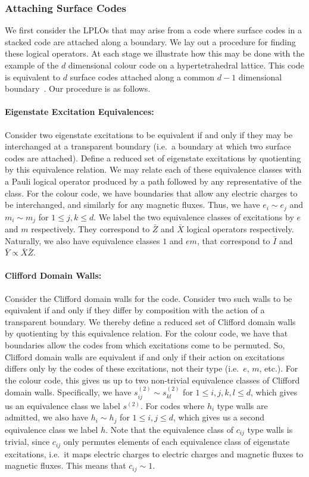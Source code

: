 \documentclass[pra,twocolumn,a4paper,nofootinbib]{revtex4-1}
\begin{document}
\subsubsection{Attaching Surface Codes}
We first consider the LPLOs that may arise from a code where surface codes in a stacked code are attached along a boundary. We lay out a procedure for finding these logical operators. At each stage we illustrate how this may be done with the example of the $d$ dimensional colour code on a hypertetrahedral lattice. This code is equivalent to $d$ surface codes attached along a common $d-1$ dimensional boundary~\cite{Kubica}. Our procedure is as follows.

\paragraph*{Eigenstate Excitation Equivalences:} Consider two eigenstate excitations to be equivalent if and only if they may be interchanged at a transparent boundary (i.e.~a boundary at which two surface codes are attached). Define a reduced set of eigenstate excitations by quotienting by this equivalence relation. We may relate each of these equivalence classes with a Pauli logical operator produced by a path followed by any representative of the class. For the colour code, we have boundaries that allow any electric charges to be interchanged, and similarly for any magnetic fluxes. Thus, we have $e_i \sim e_j$ and $m_i \sim m_j$ for $1\leq j,k \leq d$. We label the two equivalence classes of excitations by $e$ and $m$ respectively. They correspond to $\bar{Z}$ and $\bar{X}$ logical operators respectively. Naturally, we also have equivalence classes $1$ and $em$, that correspond to $\bar{I}$ and $\bar{Y} \propto \bar{X}\bar{Z}$.

\paragraph*{Clifford Domain Walls:}Consider the Clifford domain walls for the code. Consider two such walls to be equivalent if and only if they differ by composition with the action of a transparent boundary. We thereby define a reduced set of Clifford domain walls by quotienting by this equivalence relation. For the colour code, we have that boundaries allow the codes from which excitations come to be permuted. So, Clifford domain walls are equivalent if and only if their action on excitations differs only by the codes of these excitations, not their type (i.e.~$e$, $m$, etc.). For the colour code, this gives us up to two non-trivial equivalence classes of Clifford domain walls. Specifically, we have $s_{ij}^{(2)} \sim s_{kl}^{(2)}$ for $1 \leq i,j,k,l \leq d$, which gives us an equivalence class we label $s^{(2)}$. For codes where $h_i$ type walls are admitted, we also have $h_i \sim h_j$ for $1 \leq i,j \leq d$, which gives us a second equivalence class we label $h$. Note that the equivalence class of $c_{ij}$ type walls is trivial, since $c_{ij}$ only permutes elements of each equivalence class of eigenstate excitations, i.e.~it maps electric charges to electric charges and magnetic fluxes to magnetic fluxes. This means that $c_{ij} \sim 1$.
\end{document}
